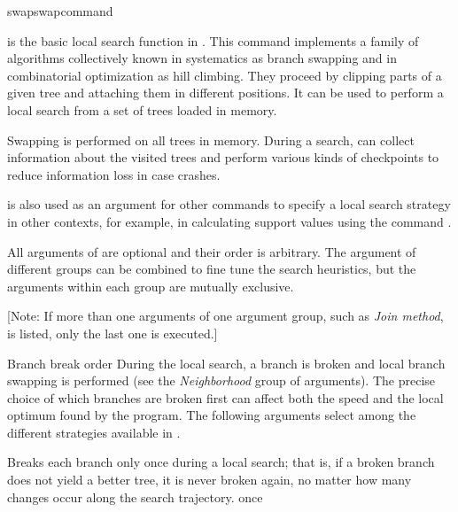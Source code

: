 \begin{command}{swap}{swapcommand}


    \begin{poydescription} 
         is the basic local search function in \poy. This
        command implements a family of algorithms collectively known in systematics as
        branch swapping and in combinatorial optimization as hill climbing. 
        They proceed by clipping parts of a given tree and
        attaching them in different positions.  It can be
        used to perform a local search from a set of trees loaded in memory.

        Swapping is performed on all trees in memory. During a search,
         can collect information about the
        visited trees and perform various kinds of checkpoints to reduce
        information loss in case \poy crashes.

         is also used as an argument for other
        commands to specify a local search strategy in other contexts, for example,
        in calculating support values using the command
        .
        
        All arguments of  are optional and their order
        is arbitrary. The argument of different groups can be combined to fine tune the search 
        heuristics, but the arguments within each group are mutually exclusive. 
        
        [Note: If more than one arguments of one argument group, such as \emph {Join method}, 
        is listed, only the last one is executed.]
    \end{poydescription}

    \begin{arguments}

        \begin{argumentgroup}{Branch break order}
            {During the local search, a branch is broken and local branch swapping
            is performed (see the \emph{Neighborhood} group of arguments).  The
            precise choice of which branches are broken first can affect both 
            the speed and the local optimum found by the program. The following 
            arguments select among the different strategies available in \poy.}
        
                {Breaks each branch only once during a local search; that is, if a
                broken branch does not yield a better tree, it is never broken again,
                no matter how many changes occur along the search trajectory.}
                {once}


\end{argumentgroup}
\end{arguments}
\end{command}
